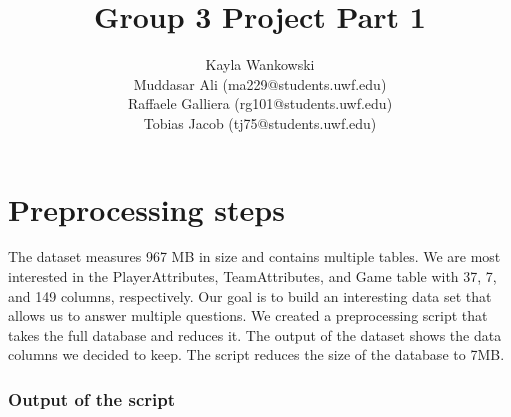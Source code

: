 \documentclass{article}
\begin{document}
\title{Group 3 Project Part 1}
\author{
    Kayla Wankowski\\
    Muddasar Ali (ma229@students.uwf.edu)\\
    Raffaele Galliera (rg101@students.uwf.edu)\\
    Tobias Jacob (tj75@students.uwf.edu)
}

\maketitle

\section{Preprocessing steps}
The dataset measures 967 MB in size and contains multiple tables.
We are most interested in the PlayerAttributes, TeamAttributes, and Game table with 37, 7, and 149 columns, respectively.
Our goal is to build an interesting data set that allows us to answer multiple questions.
We created a preprocessing script that takes the full database and reduces it.
The output of the dataset shows the data columns we decided to keep.
The script reduces the size of the database to 7MB.

\subsubsection*{Output of the script}
\end{document}
